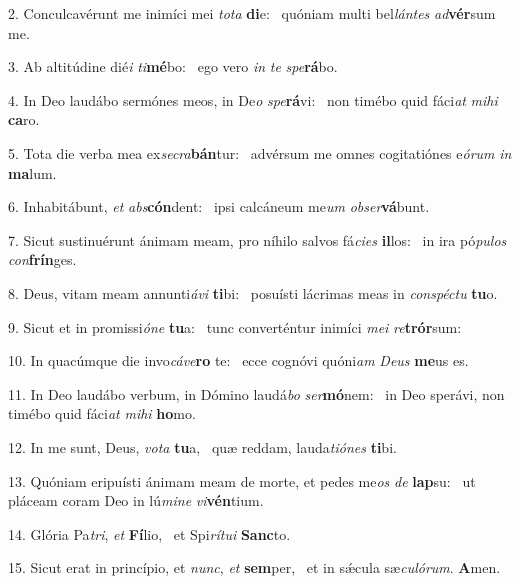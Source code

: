 2. Conculcavérunt me inimíci mei \textit{to}\textit{ta} \textbf{di}e: \ast\  quóniam multi bel\textit{lán}\textit{tes} \textit{ad}\textbf{vér}sum me.\

3. Ab altitúdine dié\textit{i} \textit{ti}\textbf{mé}bo: \ast\  ego vero \textit{in} \textit{te} \textit{spe}\textbf{rá}bo.\

4. In Deo laudábo sermónes meos, in De\textit{o} \textit{spe}\textbf{rá}vi: \ast\  non timébo quid fáci\textit{at} \textit{mi}\textit{hi} \textbf{ca}ro.\

5. Tota die verba mea ex\textit{se}\textit{cra}\textbf{bán}tur: \ast\  advérsum me omnes cogitatiónes e\textit{ó}\textit{rum} \textit{in} \textbf{ma}lum.\

6. Inhabitábunt, \textit{et} \textit{abs}\textbf{cón}dent: \ast\  ipsi calcáneum me\textit{um} \textit{ob}\textit{ser}\textbf{vá}bunt.\

7. Sicut sustinuérunt ánimam meam, pro níhilo salvos fá\textit{ci}\textit{es} \textbf{il}los: \ast\  in ira pó\textit{pu}\textit{los} \textit{con}\textbf{frín}ges.\

8. Deus, vitam meam annunti\textit{á}\textit{vi} \textbf{ti}bi: \ast\  posuísti lácrimas meas in \textit{con}\textit{spéc}\textit{tu} \textbf{tu}o.\

9. Sicut et in promissi\textit{ó}\textit{ne} \textbf{tu}a: \ast\  tunc converténtur inimíci \textit{me}\textit{i} \textit{re}\textbf{trór}sum:\

10. In quacúmque die invo\textit{cá}\textit{ve}\textbf{ro} te: \ast\  ecce cognóvi quóni\textit{am} \textit{De}\textit{us} \textbf{me}us es.\

11. In Deo laudábo verbum, in Dómino laudá\textit{bo} \textit{ser}\textbf{mó}nem: \ast\  in Deo sperávi, non timébo quid fáci\textit{at} \textit{mi}\textit{hi} \textbf{ho}mo.\

12. In me sunt, Deus, \textit{vo}\textit{ta} \textbf{tu}a, \ast\  quæ reddam, lauda\textit{ti}\textit{ó}\textit{nes} \textbf{ti}bi.\

13. Quóniam eripuísti ánimam meam de morte, et pedes me\textit{os} \textit{de} \textbf{lap}su: \ast\  ut pláceam coram Deo in lú\textit{mi}\textit{ne} \textit{vi}\textbf{vén}tium.\

14. Glória Pa\textit{tri}, \textit{et} \textbf{Fí}lio, \ast\  et Spi\textit{rí}\textit{tu}\textit{i} \textbf{Sanc}to.\

15. Sicut erat in princípio, et \textit{nunc}, \textit{et} \textbf{sem}per, \ast\  et in sǽcula sæ\textit{cu}\textit{ló}\textit{rum}. \textbf{A}men.\

